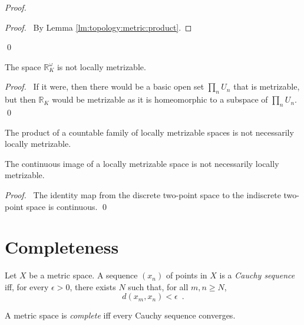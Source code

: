 \begin{proof}
  \pf
  \begin{proof}
    \pf\ By Lemma \ref{lm:topology:metric:product}.
  \end{proof}
  \qed
\end{proof}

\begin{prop}
  The space $\mathbb{R}_K^\omega$ is not locally metrizable.
\end{prop}

\begin{proof}
  \pf\ If it were, then there would be a basic open set $\prod_n U_n$ that is metrizable, but then $\mathbb{R}_K$ would be metrizable as it is homeomorphic to a subspace of $\prod_n U_n$. \qed
\end{proof}

\begin{cor}
  The product of a countable family of locally metrizable spaces is not necessarily locally metrizable.
\end{cor}

\begin{prop}
  The continuous image of a locally metrizable space is not necessarily locally metrizable.
\end{prop}

\begin{proof}
  \pf\ The identity map from the discrete two-point space to the indiscrete two-point space is continuous. \qed
\end{proof}

\section{Completeness}

\begin{df}
  Let $X$ be a metric space. A sequence $(x_n)$ of points in $X$ is a \emph{Cauchy sequence} iff, for every $\epsilon > 0$, there exists $N$ such that, for all $m, n \geq N$,
  \[ d(x_m, x_n) < \epsilon \enspace . \]
\end{df}

\begin{df}[Complete]
  A metric space is \emph{complete} iff every Cauchy sequence converges.
\end{df}


